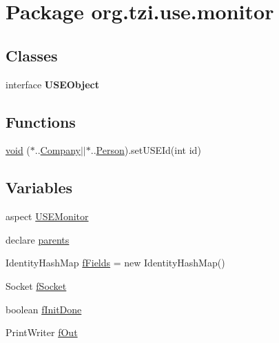 \hypertarget{namespaceorg_1_1tzi_1_1use_1_1monitor}{\section{Package org.\-tzi.\-use.\-monitor}
\label{namespaceorg_1_1tzi_1_1use_1_1monitor}
}
\subsection*{Classes}
\begin{DoxyCompactItemize}
\item 
interface {\bfseries U\-S\-E\-Object}
\end{DoxyCompactItemize}
\subsection*{Functions}
\begin{DoxyCompactItemize}
\item 
\hyperlink{namespaceorg_1_1tzi_1_1use_1_1monitor_a0684469b1421d4328849204f60f47bdb}{void} ($\ast$..\hyperlink{class_company}{Company}$\vert$$\vert$$\ast$..\hyperlink{class_person}{Person}).set\-U\-S\-E\-Id(int id)
\end{DoxyCompactItemize}
\subsection*{Variables}
\begin{DoxyCompactItemize}
\item 
aspect \hyperlink{namespaceorg_1_1tzi_1_1use_1_1monitor_a475b77c2dbeb7873d108e4e3cccc16be}{U\-S\-E\-Monitor}
\item 
declare \hyperlink{namespaceorg_1_1tzi_1_1use_1_1monitor_a55af043cfffcc5cf67a540f40211e988}{parents}
\item 
Identity\-Hash\-Map \hyperlink{namespaceorg_1_1tzi_1_1use_1_1monitor_aba7d90520dff0b24f640a722fc445f6e}{f\-Fields} = new Identity\-Hash\-Map()
\item 
Socket \hyperlink{namespaceorg_1_1tzi_1_1use_1_1monitor_a9774d6a712b4ac480ee3f1a266c9f505}{f\-Socket}
\item 
boolean \hyperlink{namespaceorg_1_1tzi_1_1use_1_1monitor_a92abedf8144f6b7e7a88ca1bc332b73f}{f\-Init\-Done}
\item 
Print\-Writer \hyperlink{namespaceorg_1_1tzi_1_1use_1_1monitor_a2029dfe3291bc83da4b8a679cbc8f95e}{f\-Out}
\end{DoxyCompactItemize}


